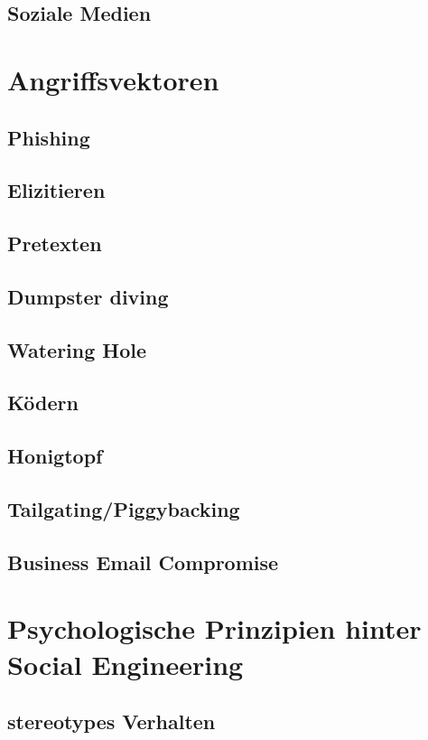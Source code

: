 \subsection{Soziale Medien}

\section{Angriffsvektoren}

\subsection{Phishing}
\subsection{Elizitieren}
\subsection{Pretexten}
\subsection{Dumpster diving}
\subsection{Watering Hole}
\subsection{Ködern}
\subsection{Honigtopf}
\subsection{Tailgating/Piggybacking}
\subsection{Business Email Compromise}

\section{Psychologische Prinzipien hinter Social Engineering}

\subsection{stereotypes Verhalten}
